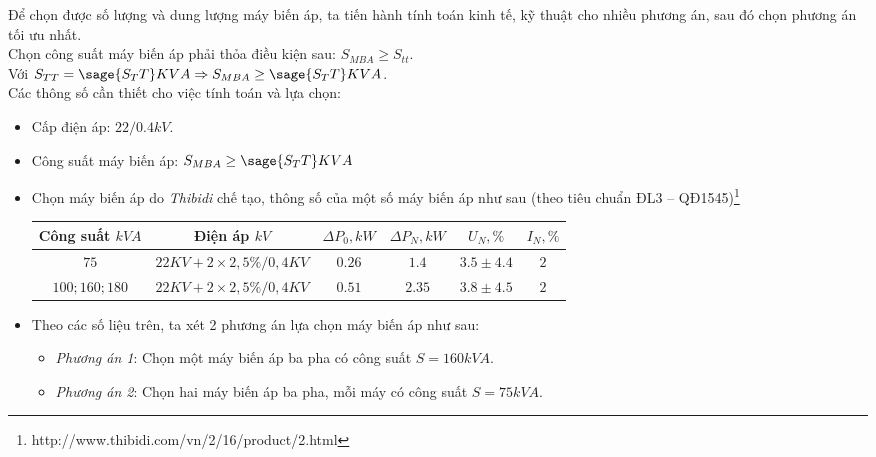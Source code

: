 \documentclass[12pt,a4paper]{article}
\begin{document}
Để chọn được số lượng và dung lượng máy biến áp, ta tiến hành tính toán kinh tế, kỹ thuật cho nhiều phương án, sau đó chọn phương án tối ưu nhất.\\

Chọn công suất máy biến áp phải thỏa điều kiện sau: $S_{MBA}\geq S_{tt}$. \\

Với $S_{TT}=\sage{S_TT}KVA\Rightarrow S_{MBA} \geq \sage{S_TT}KVA$.\\

Các thông số cần thiết cho việc tính toán và lựa chọn:
\begin{itemize}
\item Cấp điện áp: $22/0.4kV$.
\item Công suất máy biến áp: $S_{MBA} \geq \sage{S_TT}KVA$ 
\item Chọn máy biến áp do \emph{Thibidi} chế tạo, thông số của một số máy biến áp như sau (theo tiêu chuẩn ĐL3 -- QĐ1545)\footnote{http://www.thibidi.com/vn/2/16/product/2.html}
\begin{center}
\begin{tabular}{|c|c|c|c|c|c|}\hline
Công suất $kVA$ & Điện áp $kV$ & $\Delta P_0 , kW$ & $\Delta P_N, kW$ & $U_N,\%$ & $I_N,\%$\\ \hline
$75$ & $22KV + 2 \times 2,5\% / 0,4 KV$ & $0.26$ & $1.4$ & $3.5\pm4.4$ & $2$\\ \hline
$100;160;180$ & $22KV + 2 \times 2,5\% / 0,4 KV$ & $0.51$ & $2.35$ & $3.8\pm4.5$ & $2$\\ \hline
\end{tabular}
\end{center}
\item Theo các số liệu trên, ta xét 2 phương án lựa chọn máy biến áp như sau:
\begin{itemize}
\item \emph{Phương án 1}: Chọn một máy biến áp ba pha  có công suất $S=160kVA$.
\item \emph{Phương án 2}: Chọn hai máy biến áp ba pha, mỗi máy có công suất $S=75kVA$.
\end{itemize}
\end{itemize}
\end{document}
